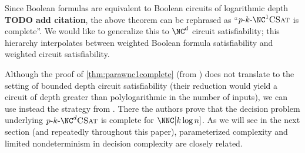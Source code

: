 \documentclass{article}
\newcommand{\todo}[1]{\textbf{TODO #1}}
\newcommand{\dash}{\textnormal{-}}
\newcommand{\pNCSAT}{p \dash k \dash \NC^d \textsc{CSat}}
\begin{document}
Since Boolean formulas are equivalent to Boolean circuits of logarithmic depth \todo{add citation}, the above theorem can be rephrased as ``$p \dash k \dash \NC^1 \textsc{CSat}$ is complete''.
We would like to generalize this to $\NC^d$ circuit satisfiability; this hierarchy interpolates between weighted Boolean formula satisfiability and weighted circuit satisfiability.

Although the proof of \autoref{thm:parawnc1complete} (from \autocite[Theorem~3.6]{est15}) does not translate to the setting of bounded depth circuit satisfiability (their reduction would yield a circuit of depth greater than polylogarithmic in the number of inputs), we can use instead the strategy from \autocite[Theorem~3.6]{cc97lim}.
There the authors prove that the decision problem underlying $\pNCSAT$ is complete for $\NNC[k \log n]$.
As we will see in the next section (and repeatedly throughout this paper), parameterized complexity and limited nondeterminism in decision complexity are closely related.
\end{document}
